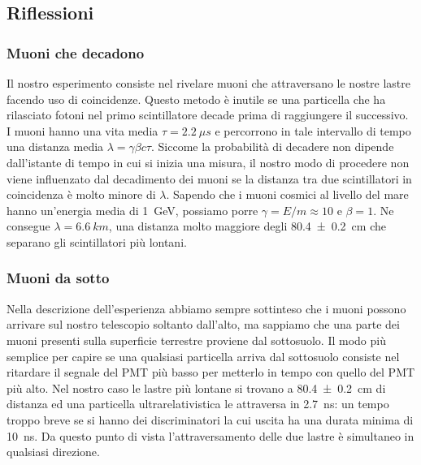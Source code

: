 \subsection{Riflessioni} 

\subsubsection{Muoni che decadono}

Il nostro esperimento consiste nel rivelare muoni che attraversano le nostre lastre facendo uso di coincidenze. Questo metodo è inutile se una particella che ha rilasciato fotoni nel primo scintillatore decade prima di raggiungere il successivo.  I muoni hanno una vita media $\tau=\SI{2.2}{\mu s}$ e percorrono in tale intervallo di tempo una distanza media $\lambda=\gamma\beta c\tau$. Siccome la probabilità di decadere non dipende dall'istante di tempo in cui si inizia una misura, il nostro modo di procedere non viene influenzato dal decadimento dei muoni se la distanza tra due scintillatori in coincidenza è molto minore di $\lambda$. Sapendo che i muoni cosmici al livello del mare hanno un'energia media di \SI{1}{GeV}, possiamo porre $\gamma=E/m\approx10$ e $\beta=1$. Ne consegue $\lambda=\SI{6.6}{km}$, una distanza molto maggiore degli \SI{80.4\pm0.2}{cm} che separano gli scintillatori più lontani.

\subsubsection{Muoni da sotto}

Nella descrizione dell'esperienza abbiamo sempre sottinteso che i muoni possono arrivare sul nostro telescopio soltanto dall'alto, ma sappiamo che una parte dei muoni presenti sulla superficie terrestre proviene dal sottosuolo.
Il modo più semplice per capire se una qualsiasi particella arriva dal sottosuolo consiste nel ritardare il segnale del PMT più basso per metterlo in tempo con quello del PMT più alto. Nel nostro caso le lastre più lontane si trovano a \SI{80.4\pm0.2}{cm} di distanza ed una particella ultrarelativistica le attraversa in \SI{2.7}{ns}: un tempo troppo breve se si hanno dei discriminatori la cui uscita ha una durata minima di \SI{10}{ns}. Da questo punto di vista l'attraversamento delle due lastre è simultaneo in qualsiasi direzione.

